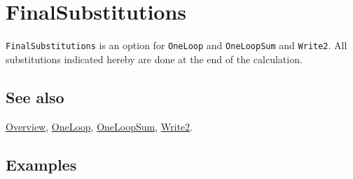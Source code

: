 \documentclass[../FeynCalcManual.tex]{subfiles}
\begin{document}
\hypertarget{finalsubstitutions}{%
\section{FinalSubstitutions}\label{finalsubstitutions}}

\texttt{FinalSubstitutions} is an option for \texttt{OneLoop} and
\texttt{OneLoopSum} and \texttt{Write2}. All substitutions indicated
hereby are done at the end of the calculation.

\subsection{See also}

\hyperlink{toc}{Overview}, \hyperlink{oneloop}{OneLoop},
\hyperlink{oneloopsum}{OneLoopSum}, \hyperlink{write2}{Write2}.

\subsection{Examples}
\end{document}
